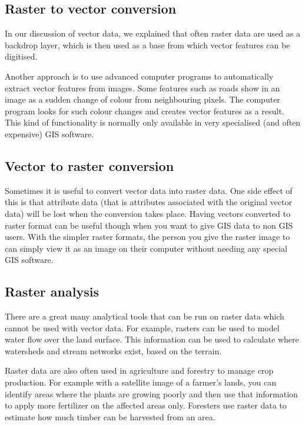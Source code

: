 \subsection{Raster to vector conversion}

In our discussion of vector data, we explained that often raster data are
used as a backdrop layer, which is then used as a base from which vector
features can be digitised.

Another approach is to use advanced computer programs to automatically
extract vector features from images. Some features such as roads show in an
image as a sudden change of colour from neighbouring pixels. The computer
program looks for such colour changes and creates vector features as a
result. This kind of functionality is normally only available in very
specialised (and often expensive) GIS software.

\subsection{Vector to raster conversion}

Sometimes it is useful to convert vector data into raster data. One side
effect of this is that attribute data (that is attributes associated with the
original vector data) will be lost when the conversion takes place. Having
vectors converted to raster format can be useful though when you want to give
GIS data to non GIS users. With the simpler raster formats, the person you
give the raster image to can simply view it as an image on their computer
without needing any special GIS software.

\subsection{Raster analysis}

There are a great many analytical tools that can be run on raster data which
cannot be used with vector data. For example, rasters can be used to model
water flow over the land surface. This information can be used to calculate
where watersheds and stream networks exist, based on the terrain.

Raster data are also often used in agriculture and forestry to manage crop
production. For example with a satellite image of a farmer's lands, you can
identify areas where the plants are growing poorly and then use that
information to apply more fertilizer on the affected areas only. Foresters
use raster data to estimate how much timber can be harvested from an area.

